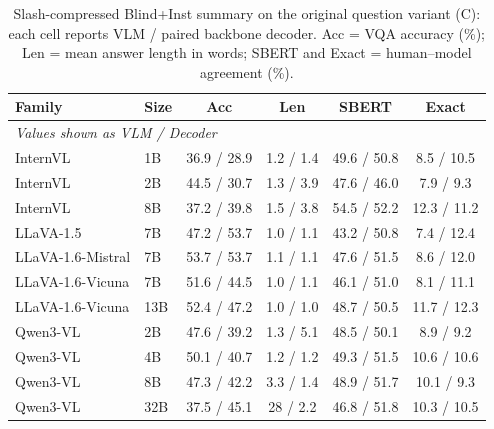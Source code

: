 \begin{table}[t]
\scriptsize
\centering
\setlength{\tabcolsep}{3pt}
\begin{tabular}{ll|cccc}
\toprule
\textbf{Family} & \textbf{Size} & \textbf{Acc} & \textbf{Len} & \textbf{SBERT} & \textbf{Exact} \\
\midrule
\multicolumn{6}{l}{\textit{Values shown as VLM / Decoder}} \\
\midrule
InternVL & 1B & 36.9 / 28.9 & 1.2 / 1.4 & 49.6 / 50.8 & 8.5 / 10.5 \\
InternVL & 2B & 44.5 / 30.7 & 1.3 / 3.9 & 47.6 / 46.0 & 7.9 / 9.3 \\
InternVL & 8B & 37.2 / 39.8 & 1.5 / 3.8 & 54.5 / 52.2 & 12.3 / 11.2 \\
LLaVA-1.5 & 7B & 47.2 / 53.7 & 1.0 / 1.1 & 43.2 / 50.8 & 7.4 / 12.4 \\
LLaVA-1.6-Mistral & 7B & 53.7 / 53.7 & 1.1 / 1.1 & 47.6 / 51.5 & 8.6 / 12.0 \\
LLaVA-1.6-Vicuna & 7B & 51.6 / 44.5 & 1.0 / 1.1 & 46.1 / 51.0 & 8.1 / 11.1 \\
LLaVA-1.6-Vicuna & 13B & 52.4 / 47.2 & 1.0 / 1.0 & 48.7 / 50.5 & 11.7 / 12.3 \\
Qwen3-VL & 2B & 47.6 / 39.2 & 1.3 / 5.1 & 48.5 / 50.1 & 8.9 / 9.2 \\
Qwen3-VL & 4B & 50.1 / 40.7 & 1.2 / 1.2 & 49.3 / 51.5 & 10.6 / 10.6 \\
Qwen3-VL & 8B & 47.3 / 42.2 & 3.3 / 1.4 & 48.9 / 51.7 & 10.1 / 9.3 \\
Qwen3-VL & 32B & 37.5 / 45.1 & 28 / 2.2 & 46.8 / 51.8 & 10.3 / 10.5 \\
\bottomrule
\end{tabular}
\caption{\small Slash-compressed Blind+Inst summary on the original question variant (C): each cell reports VLM / paired backbone decoder. Acc = VQA accuracy (\%); Len = mean answer length in words; SBERT and Exact = human--model agreement (\%).}
\label{tab:summary_vlm_decoder_vc_slash}
\end{table}
